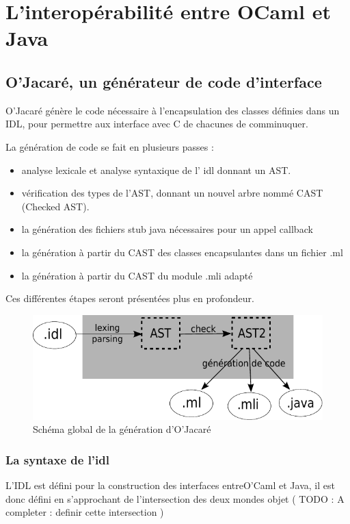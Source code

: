 \documentclass[a4paper, 11pt, notitlepage]{article}
\begin{document}
\newpage

\section{L'interopérabilité entre OCaml et Java}


\subsection{O'Jacaré, un générateur de code d'interface}
O'Jacaré génère le code nécessaire à l'encapsulation des classes
définies dans un IDL, pour permettre aux interface avec C de chacunes
de comminuquer.

La génération de code se fait en plusieurs passes :
\begin{itemize}
\item analyse lexicale et analyse syntaxique de l' idl donnant un AST.
\item vérification des types de l'AST, donnant un nouvel arbre nommé
  CAST (Checked AST).
\item la génération des fichiers stub java nécessaires pour un appel callback 
\item la génération à partir du CAST des classes encapsulantes dans un fichier .ml
\item la génération à partir du CAST du module .mli adapté
\end{itemize}
Ces différentes étapes seront présentées plus en profondeur.

\begin{figure}[h]
  \centering
  \includegraphics{schemaOjacare.pdf}
  \caption{Schéma global de la génération d'O'Jacaré}
\end{figure}


\subsubsection{La syntaxe de l'idl}
L'IDL est défini pour la construction des interfaces entreO'Caml et
Java, il est donc défini en s'approchant de l'intersection des deux
mondes objet ( TODO : A completer : definir cette intersection )
\end{document}
